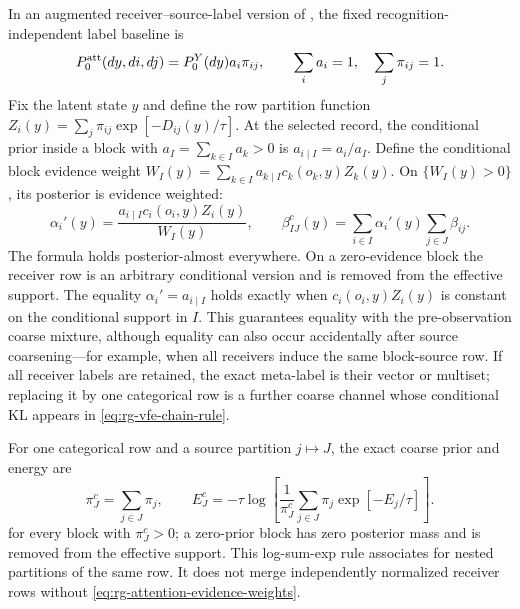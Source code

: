 In an augmented receiver--source-label version of
, the fixed recognition-independent label
baseline is
\begin{equation}
P_0^{\rm att}(dy,di,dj)=P_0^Y(dy)a_i\pi_{ij},
\qquad
\sum_i a_i=1,
\quad
\sum_j\pi_{ij}=1.
\label{eq:rg-attention-fixed-label-joint}
\end{equation}
Fix the latent state $y$ and define the row partition function
$Z_i(y)=\sum_j\pi_{ij}\exp[-D_{ij}(y)/\tau]$.  At the selected record, the
conditional prior inside a block with $a_I=\sum_{k\in I}a_k>0$ is
$a_{i\mid I}=a_i/a_I$.  Define the conditional block evidence weight
$W_I(y)=\sum_{k\in I}a_{k\mid I}c_k(o_k,y)Z_k(y)$.  On
$\{W_I(y)>0\}$, its posterior is evidence weighted:
\begin{equation}
\alpha_i'(y)=\frac{a_{i\mid I} c_i(o_i,y)Z_i(y)}
{W_I(y)},
\qquad
\beta^c_{IJ}(y)=\sum_{i\in I}\alpha_i'(y)
\sum_{j\in J}\beta_{ij}.
\label{eq:rg-attention-evidence-weights}
\end{equation}
The formula holds posterior-almost everywhere.  On a zero-evidence block the
receiver row is an arbitrary conditional version and is removed from the
effective support.
The equality $\alpha_i'=a_{i\mid I}$ holds exactly when
$c_i(o_i,y)Z_i(y)$ is constant on the conditional support in $I$.  This
guarantees equality with the pre-observation coarse
mixture, although equality can also occur accidentally after source
coarsening---for example, when all receivers induce the same block-source row.
If all receiver labels are retained, the exact meta-label is
their vector or multiset; replacing it by one categorical row is a further
coarse channel whose conditional KL appears in
\eqref{eq:rg-vfe-chain-rule}.  

For one categorical row and a source partition $j\mapsto J$, the exact coarse
prior and energy are
\begin{equation}
\pi^c_J=\sum_{j\in J}\pi_j,
\qquad
E^c_J=-\tau\log\left[
\frac{1}{\pi^c_J}\sum_{j\in J}\pi_j\exp[-E_j/\tau]
\right].
\label{eq:rg-attention-log-sum-exp}
\end{equation}
for every block with $\pi_J^c>0$; a zero-prior block has zero posterior mass and
is removed from the effective support.  This log-sum-exp rule associates for nested partitions of the same row.  It
does not merge independently normalized receiver rows without
\eqref{eq:rg-attention-evidence-weights}.  

